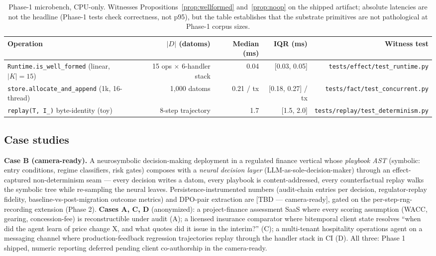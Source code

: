 \documentclass[anon]{nesy2026}   %
\newcommand{\C}[1]{\texttt{#1}}
\begin{document}
\begin{table}[ht]
\centering
\small
\begin{tabular}{lrrrr}
\toprule
\textbf{Operation} & \textbf{$|D|$ (datoms)} & \textbf{Median (ms)} & \textbf{IQR (ms)} & \textbf{Witness test} \\
\midrule
\C{Runtime.is\_well\_formed} (linear, $|K|{=}15$) & 15 ops $\times$ 6-handler stack & 0.04 & [0.03, 0.05] & \C{tests/effect/test\_runtime.py} \\
\C{store.allocate\_and\_append} (1k, 16-thread) & 1{,}000 datoms & 0.21 / tx & [0.18, 0.27] / tx & \C{tests/fact/test\_concurrent.py} \\
\C{replay(T, I_{\text{noop}})} byte-identity (toy) & 8-step trajectory & 1.7 & [1.5, 2.0] & \C{tests/replay/test\_determinism.py} \\
\bottomrule
\end{tabular}
\caption{Phase-1 microbench, CPU-only. Witnesses Propositions~\ref{prop:wellformed} and~\ref{prop:noop} on the shipped artifact; absolute latencies are not the headline (Phase-1 tests check correctness, not p95), but the table establishes that the substrate primitives are not pathological at Phase-1 corpus sizes.}
\label{tab:microbench}
\end{table}

\subsection{Case studies}\label{sec:eval-cases}

\textbf{Case B (camera-ready).} A neurosymbolic decision-making deployment in a regulated finance vertical whose \emph{playbook AST} (symbolic: entry conditions, regime classifiers, risk gates) composes with a \emph{neural decision layer} (LLM-as-sole-decision-maker) through an effect-captured non-determinism seam --- every decision writes a datom, every playbook is content-addressed, every counterfactual replay walks the symbolic tree while re-sampling the neural leaves. Persistence-instrumented numbers (audit-chain entries per decision, regulator-replay fidelity, baseline-vs-post-migration outcome metrics) and DPO-pair extraction are [TBD --- camera-ready], gated on the per-step-rng-recording extension (Phase 2). \textbf{Cases A, C, D} (anonymized): a project-finance assessment SaaS where every scoring assumption (WACC, gearing, concession-fee) is reconstructible under audit (A); a licensed insurance comparator where bitemporal client state resolves ``when did the agent learn of price change X, and what quotes did it issue in the interim?'' (C); a multi-tenant hospitality operations agent on a messaging channel where production-feedback regression trajectories replay through the handler stack in CI (D). All three: Phase 1 shipped, numeric reporting deferred pending client co-authorship in the camera-ready.
\end{document}
